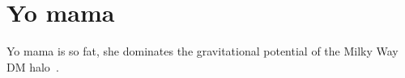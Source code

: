 \chapter{Yo mama}
\label{chap:yomama}
Yo mama is so fat, she dominates the gravitational potential of the Milky Way DM halo~\citep{karlen17}.
